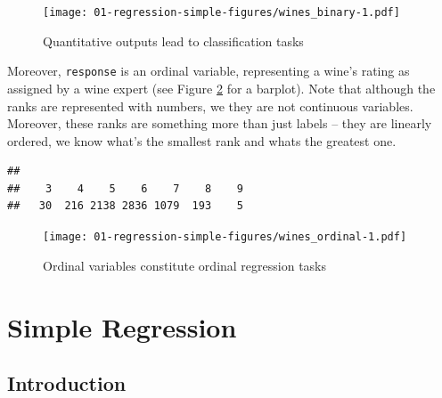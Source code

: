 \documentclass[10pt,b5paper,krantz1]{krantz}
\newenvironment{Shaded}{\begin{snugshade}}{\end{snugshade}}
\newcommand{\CommentTok}[1]{\textcolor[rgb]{0.37,0.37,0.37}{\textit{#1}}}
\newcommand{\DataTypeTok}[1]{\textcolor[rgb]{0.27,0.27,0.27}{#1}}
\newcommand{\DecValTok}[1]{\textcolor[rgb]{0.06,0.06,0.06}{#1}}
\newcommand{\KeywordTok}[1]{\textcolor[rgb]{0.27,0.27,0.27}{\textbf{#1}}}
\newcommand{\NormalTok}[1]{#1}
\newcommand{\OperatorTok}[1]{\textcolor[rgb]{0.43,0.43,0.43}{\textbf{#1}}}
\newcommand{\StringTok}[1]{\textcolor[rgb]{0.5,0.5,0.5}{#1}}
\begin{document}
\begin{figure}
\hypertarget{fig:wines_binary}{%
\centering
\texttt{[image: 01-regression-simple-figures/wines\_binary-1.pdf]}
\caption{Quantitative outputs lead to classification tasks}\label{fig:wines_binary}
}
\end{figure}

Moreover, \texttt{response} is an ordinal variable, representing
a wine's rating as assigned by a wine expert
(see Figure \ref{fig:wines_ordinal} for a barplot).
Note that although the ranks are represented with numbers,
we they are not continuous variables. Moreover,
these ranks are something more than just labels -- they are linearly
ordered, we know what's the smallest rank and whats the greatest one.

\begin{Shaded}
\end{Shaded}

\begin{verbatim}
## 
##    3    4    5    6    7    8    9 
##   30  216 2138 2836 1079  193    5
\end{verbatim}

\begin{Shaded}
\end{Shaded}

\begin{figure}
\hypertarget{fig:wines_ordinal}{%
\centering
\texttt{[image: 01-regression-simple-figures/wines\_ordinal-1.pdf]}
\caption{Ordinal variables constitute ordinal regression tasks}\label{fig:wines_ordinal}
}
\end{figure}

\hypertarget{simple-regression}{%
\section{Simple Regression}\label{simple-regression}}

\hypertarget{introduction}{%
\subsection{Introduction}\label{introduction}}
\end{document}

